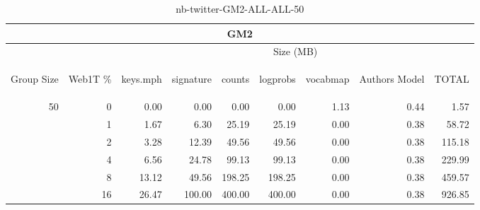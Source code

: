 \begin{center}
\begin{table}[htbp] 
 \begin{center}
\begin{tabular}{ | r | r | r | r | r | r | r | r | r |}
\hline
\multicolumn{9}{|c|}{GM2}\\
\hline
 & & \multicolumn{7}{|c|}{Size (MB)}\\ \cline{3-9}
\begin{sideways}Group Size\end{sideways} & \begin{sideways}Web1T \% \end{sideways} & \begin{sideways}keys.mph\end{sideways} & \begin{sideways}signature\end{sideways} & \begin{sideways}counts\end{sideways} & \begin{sideways}logprobs\end{sideways} & \begin{sideways}vocabmap\end{sideways} & \begin{sideways}Authors Model \end{sideways} & \begin{sideways}TOTAL\end{sideways}\\
\hline
\multirow{5}{*}{50}
 & 0 & 0.00 & 0.00 & 0.00 & 0.00 & 1.13 & 0.44 & 1.57\\ \cline{2-9}
 & 1 & 1.67 & 6.30 & 25.19 & 25.19 & 0.00 & 0.38 & 58.72\\ \cline{2-9}
 & 2 & 3.28 & 12.39 & 49.56 & 49.56 & 0.00 & 0.38 & 115.18\\ \cline{2-9}
 & 4 & 6.56 & 24.78 & 99.13 & 99.13 & 0.00 & 0.38 & 229.99\\ \cline{2-9}
 & 8 & 13.12 & 49.56 & 198.25 & 198.25 & 0.00 & 0.38 & 459.57\\ \cline{2-9}
 & 16 & 26.47 & 100.00 & 400.00 & 400.00 & 0.00 & 0.38 & 926.85\\ \cline{2-9}
\hline
\end{tabular}
\caption{nb-twitter-GM2-ALL-ALL-50}
\label{table:nb-twitter-GM2-ALL-ALL-50}
\end{center}
 \end{table}
\end{center}

